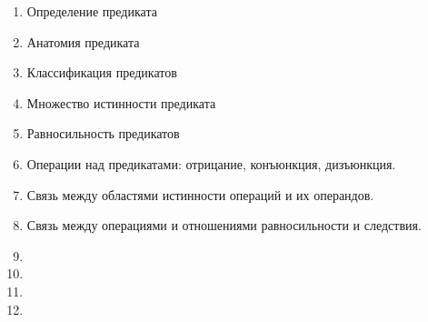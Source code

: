 \begin{enumerate}
\item Определение предиката
\item Анатомия предиката
\item Классификация предикатов
\item Множество истинности предиката
\item Равносильность предикатов
\item Операции над предикатами: отрицание, конъюнкция, дизъюнкция.
\item Связь между областями истинности операций и их операндов.
\item Связь между операциями и отношениями равносильности и следствия.
\item
\item
\item
\item
\end{enumerate}
